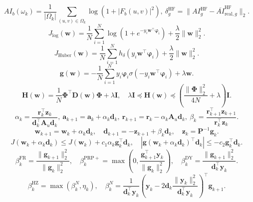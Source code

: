 \documentclass[journal]{IEEEtran}
\begin{document}
\begin{equation}AI_b(\omega_k)=\frac{1}{|\Omega_k|}\sum_{(u,v)\in\Omega_k}\log(1+|F_b(u,v)|^2),\ \delta_g^{\mathrm{HF}}=\|AI_g^{\mathrm{HF}}-\overline{AI}_{\mathrm{real},g}^{\mathrm{HF}}\|_2.\label{eq:9}\end{equation}
\begin{equation}J_{\mathrm{log}}(\mathbf{w})=\frac{1}{N}\sum_{i=1}^N\log(1+e^{-y_i\mathbf{w}^\top\boldsymbol{\varphi}_i})+\frac{\lambda}{2}\|\mathbf{w}\|_2^2.\label{eq:10}\end{equation}
\begin{equation}J_{\mathrm{Huber}}(\mathbf{w})=\frac{1}{N}\sum_{i=1}^N h_\delta(y_i\mathbf{w}^\top\boldsymbol{\varphi}_i)+\frac{\lambda}{2}\|\mathbf{w}\|_2^2.\label{eq:11}\end{equation}
\begin{equation}\mathbf{g}(\mathbf{w})=-\frac{1}{N}\sum_{i=1}^N y_i\boldsymbol{\varphi}_i\sigma(-y_i\mathbf{w}^\top\boldsymbol{\varphi}_i)+\lambda\mathbf{w}.\label{eq:12}\end{equation}
\begin{equation}\mathbf{H}(\mathbf{w})=\frac{1}{N}\mathbf{\Phi}^\top\mathbf{D}(\mathbf{w})\mathbf{\Phi}+\lambda\mathbf{I},\quad \lambda\mathbf{I}\preceq\mathbf{H}(\mathbf{w})\preceq\left(\frac{\|\mathbf{\Phi}\|_2^2}{4N}+\lambda\right)\mathbf{I}.\label{eq:13}\end{equation}
\begin{equation}\alpha_k=\frac{\mathbf{r}_k^\top\mathbf{z}_k}{\mathbf{d}_k^\top\mathbf{A}_u\mathbf{d}_k},\ \mathbf{a}_{k+1}=\mathbf{a}_k+\alpha_k\mathbf{d}_k,\ \mathbf{r}_{k+1}=\mathbf{r}_k-\alpha_k\mathbf{A}_u\mathbf{d}_k,\ \beta_k=\frac{\mathbf{r}_{k+1}^\top\mathbf{z}_{k+1}}{\mathbf{r}_k^\top\mathbf{z}_k}.\label{eq:14}\end{equation}
\begin{equation}\mathbf{w}_{k+1}=\mathbf{w}_k+\alpha_k\mathbf{d}_k,\quad \mathbf{d}_{k+1}=-\mathbf{z}_{k+1}+\beta_k\mathbf{d}_k,\quad \mathbf{z}_k=\mathbf{P}^{-1}\mathbf{g}_k.\label{eq:15}\end{equation}
\begin{equation}J(\mathbf{w}_k+\alpha_k\mathbf{d}_k)\le J(\mathbf{w}_k)+c_1\alpha_k\mathbf{g}_k^\top\mathbf{d}_k,\quad |\mathbf{g}(\mathbf{w}_k+\alpha_k\mathbf{d}_k)^\top\mathbf{d}_k|\le -c_2\mathbf{g}_k^\top\mathbf{d}_k.\label{eq:16}\end{equation}
\begin{equation}\beta_k^{\mathrm{FR}}=\frac{\|\mathbf{g}_{k+1}\|_2^2}{\|\mathbf{g}_k\|_2^2},\quad \beta_k^{\mathrm{PRP+}}=\max\!\left(0,\frac{\mathbf{g}_{k+1}^\top\mathbf{y}_k}{\|\mathbf{g}_k\|_2^2}\right),\quad \beta_k^{\mathrm{DY}}=\frac{\|\mathbf{g}_{k+1}\|_2^2}{\mathbf{d}_k^\top\mathbf{y}_k}.\label{eq:17}\end{equation}
\begin{equation}\beta_k^{\mathrm{HZ}}=\max(\beta_k^N,\eta_k),\quad \beta_k^N=\frac{1}{\mathbf{d}_k^\top\mathbf{y}_k}\left(\mathbf{y}_k-2\mathbf{d}_k\frac{\|\mathbf{y}_k\|_2^2}{\mathbf{d}_k^\top\mathbf{y}_k}\right)^\top\mathbf{g}_{k+1}.\label{eq:18}\end{equation}
\end{document}

